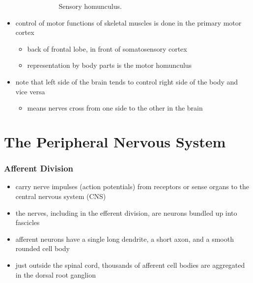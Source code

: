 \documentclass[10pt]{article}
\begin{document}
\begin{itemize}
\begin{itemize}
\begin{itemize}
\begin{figure}[h]
                            \caption{Sensory homunculus.}
                            \label{fig:sensoryHomunculus}
                        \end{figure}
                \end{itemize}
        \end{itemize}
    \item control of motor functions of skeletal muscles is done in the primary motor cortex 
        \begin{itemize}
            \item back of frontal lobe, in front of somatosensory cortex 
            \item representation by body parts is the motor homunculus
        \end{itemize}
    \item note that left side of the brain tends to control right side of the body and vice versa
        \begin{itemize}
            \item means nerves cross from one side to the other in the brain
        \end{itemize}
\end{itemize}






\part{The Peripheral Nervous System}
\section{Afferent Division}
\begin{itemize}
    \item carry nerve impulses (action potentials) from receptors or sense organs to the central nervous system (CNS)
    \item the nerves, including in the efferent division, are neurons bundled up into fascicles
    \item afferent neurons have a single long dendrite, a short axon, and a smooth rounded cell body
    \item just outside the spinal cord, thousands of afferent cell bodies are aggregated in the dorsal root ganglion
\end{itemize}
\end{document}
